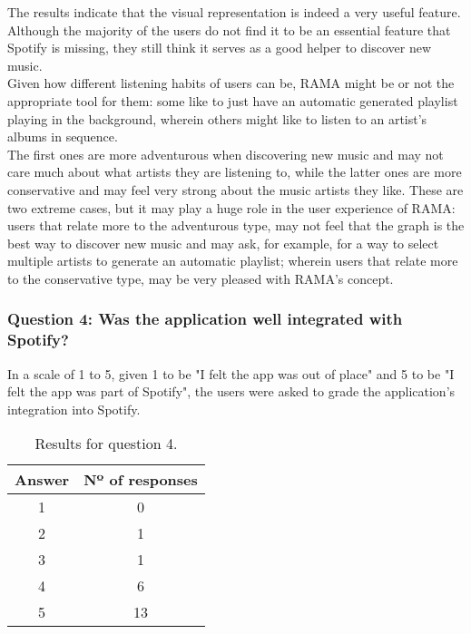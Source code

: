       The results indicate that the visual representation is indeed a very useful feature.
      Although the majority of the users do not find it to be an essential feature that Spotify is missing, they still think it serves as a good helper to discover new music. \\

      Given how different listening habits of users can be, RAMA might be or not the appropriate tool for them: some like to just have an automatic generated playlist playing in the background, wherein others might like to listen to an artist's albums in sequence. \\
      The first ones are more adventurous when discovering new music and may not care much about what artists they are listening to, while the latter ones are more conservative and may feel very strong about the music artists they like.
      These are two extreme cases, but it may play a huge role in the user experience of RAMA: users that relate more to the adventurous type, may not feel that the graph is the best way to discover new music and may ask, for example, for a way to select multiple artists to generate an automatic playlist; wherein users that relate more to the conservative type, may be very pleased with RAMA's concept.


    \subsubsection{Question 4: Was the application well integrated with Spotify?}
    \label{ssub:question_4}

      In a scale of 1 to 5, given 1 to be "I felt the app was out of place" and 5 to be "I felt the app was part of Spotify", the users were asked to grade the application's integration into Spotify.

      \begin{table}[hb]
        \begin{center}
          \begin{tabular}{c|c}

            \hline
            \textbf{Answer} & \textbf{Nº of responses} \\
            \hline
            1 & 0 \\
            2 & 1 \\
            3 & 1 \\
            4 & 6 \\
            5 & 13 \\
            \hline
          \end{tabular}
        \end{center}
        \caption{Results for question 4.}
        \label{tab:question4}
       \end{table}

